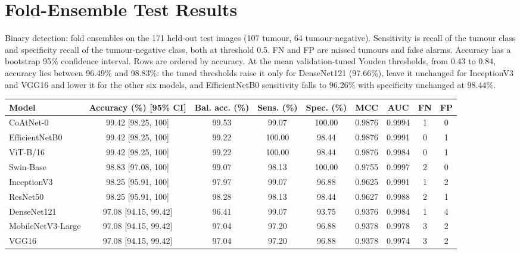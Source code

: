 \documentclass[a4paper,fleqn]{cas-sc}
\begin{document}
\section{Fold-Ensemble Test Results}
\label{sec:supp-test}

\begin{heretable}
\centering
\caption{Binary detection: fold ensembles on the 171 held-out test images (107 tumour, 64 tumour-negative). Sensitivity is recall of the tumour class and specificity recall of the tumour-negative class, both at threshold 0.5. FN and FP are missed tumours and false alarms. Accuracy has a bootstrap 95\% confidence interval. Rows are ordered by accuracy. At the mean validation-tuned Youden thresholds, from 0.43 to 0.84, accuracy lies between 96.49\% and 98.83\%: the tuned thresholds raise it only for DenseNet121 (97.66\%), leave it unchanged for InceptionV3 and VGG16 and lower it for the other six models, and EfficientNetB0 sensitivity falls to 96.26\% with specificity unchanged at 98.44\%.}
\label{tab:binary-results}
\small
\begin{tabular*}{\textwidth}{@{\extracolsep{\fill}}lcccccccc@{}}
\toprule
Model & Accuracy (\%) [95\% CI] & Bal. acc. (\%) & Sens. (\%) & Spec. (\%) & MCC & AUC & FN & FP \\
\midrule
CoAtNet-0 & 99.42 [98.25, 100] & 99.53 & 99.07 & 100.00 & 0.9876 & 0.9994 & 1 & 0 \\
EfficientNetB0 & 99.42 [98.25, 100] & 99.22 & 100.00 & 98.44 & 0.9876 & 0.9991 & 0 & 1 \\
ViT-B/16 & 99.42 [98.25, 100] & 99.22 & 100.00 & 98.44 & 0.9876 & 0.9984 & 0 & 1 \\
Swin-Base & 98.83 [97.08, 100] & 99.07 & 98.13 & 100.00 & 0.9755 & 0.9997 & 2 & 0 \\
InceptionV3 & 98.25 [95.91, 100] & 97.97 & 99.07 & 96.88 & 0.9625 & 0.9991 & 1 & 2 \\
ResNet50 & 98.25 [95.91, 100] & 98.28 & 98.13 & 98.44 & 0.9627 & 0.9988 & 2 & 1 \\
DenseNet121 & 97.08 [94.15, 99.42] & 96.41 & 99.07 & 93.75 & 0.9376 & 0.9984 & 1 & 4 \\
MobileNetV3-Large & 97.08 [94.15, 99.42] & 97.04 & 97.20 & 96.88 & 0.9378 & 0.9978 & 3 & 2 \\
VGG16 & 97.08 [94.15, 99.42] & 97.04 & 97.20 & 96.88 & 0.9378 & 0.9974 & 3 & 2 \\
\bottomrule
\end{tabular*}
\end{heretable}
\end{document}
